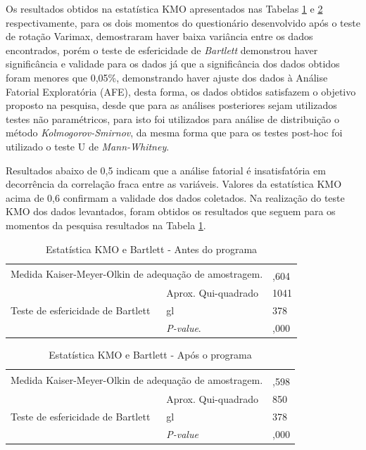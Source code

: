 Os resultados obtidos na estatística KMO apresentados nas Tabelas \ref{tabela_8} e \ref{tabela_9} respectivamente, para os dois momentos do questionário desenvolvido após o teste de rotação Varimax,  demostraram haver baixa variância entre os dados encontrados, porém o teste de esfericidade de \textit{Bartlett} demonstrou haver significância e validade para os dados já que a significância dos dados obtidos foram menores que 0,05\%, demonstrando haver ajuste dos dados à Análise Fatorial Exploratória (AFE), desta forma, os dados obtidos satisfazem o objetivo proposto na pesquisa, desde que para as análises posteriores sejam utilizados testes não paramétricos, para isto foi utilizados para análise de distribuição o método \textit{Kolmogorov-Smirnov}, da mesma forma que para os testes post-hoc foi utilizado o teste U de \textit{Mann-Whitney}.


Resultados abaixo de 0,5 indicam que a análise fatorial é insatisfatória em decorrência da correlação fraca entre as variáveis. Valores da estatística KMO acima de 0,6 confirmam a validade dos dados coletados. Na realização do teste KMO dos dados levantados, foram obtidos os resultados que seguem para os momentos da pesquisa resultados na Tabela \ref{tabela_8}.

\begin{table}[H]
\FloatBarrier
\centering
\caption{Estatística KMO e Bartlett - Antes do programa}
\label{tabela_8}
\begin{tabular}{ll|l}
\hline\hline
\multicolumn{2}{l|}{\multirow{2}{*}{Medida Kaiser-Meyer-Olkin de adequação de amostragem.}} &  \\
\multicolumn{2}{l|}{} & ,604 \\ \hline
\multirow{3}{*}{Teste de esfericidade de Bartlett} & Aprox. Qui-quadrado & 1041 \\
 & gl & 378 \\
 & \textit{P-value}. & ,000 \\ \hline
\end{tabular}
\end{table}

\begin{table}[H]
\FloatBarrier
\centering
\caption{Estatística KMO e Bartlett - Após o programa}
\label{tabela_9}
\begin{tabular}{ll|l}
\hline\hline
\multicolumn{2}{l|}{\multirow{2}{*}{Medida Kaiser-Meyer-Olkin de adequação de amostragem.}} &  \\
\multicolumn{2}{l|}{} & ,598 \\ \hline
\multirow{3}{*}{Teste de esfericidade de Bartlett} & Aprox. Qui-quadrado & 850 \\
 & gl & 378 \\
 & \textit{P-value} & ,000 \\ \hline
\end{tabular}
\end{table}

